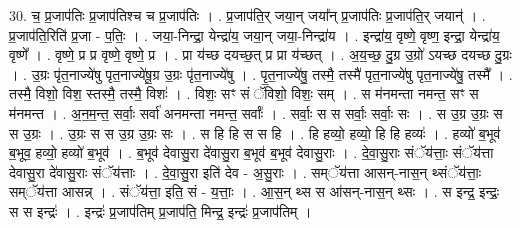 \documentclass[17pt]{extarticle}
\begin{document}
30. च॒ प्र॒जाप॑तिः प्र॒जाप॑तिश्च च प्र॒जाप॑तिः । . प्र॒जाप॑ति॒र् जया॒न् जया᳚न् प्र॒जाप॑तिः प्र॒जाप॑ति॒र् जयान्॑ । . प्र॒जाप॑ति॒रिति॑ प्र॒जा - प॒तिः॒ । . जया॒-निन्द्रा॒ येन्द्रा॑य॒ जया॒न् जया॒-निन्द्रा॑य । . इन्द्रा॑य॒ वृष्णे॒ वृष्ण॒ इन्द्रा॒ येन्द्रा॑य॒ वृष्णे᳚ । . वृष्णे॒ प्र प्र वृष्णे॒ वृष्णे॒ प्र । . प्रा य॑च्छ दयच्छ॒त् प्र प्रा य॑च्छत् । . अ॒य॒च्छ॒ दु॒ग्र उ॒ग्रो॑ ऽयच्छ दयच्छ दु॒ग्रः । . उ॒ग्रः पृ॑त॒नाज्ये॑षु पृत॒नाज्ये॑षू॒ग्र उ॒ग्रः पृ॑त॒नाज्ये॑षु । . पृ॒त॒नाज्ये॑षु॒ तस्मै॒ तस्मै॑ पृत॒नाज्ये॑षु पृत॒नाज्ये॑षु॒ तस्मै᳚ । . तस्मै॒ विशो॒ विश॒ स्तस्मै॒ तस्मै॒ विशः॑ । . विशः॒ सꣳ सं ॅविशो॒ विशः॒ सम् । . स म॑नमन्ता नमन्त॒ सꣳ स म॑नमन्त । . अ॒न॒म॒न्त॒ सर्वाः॒ सर्वा॑ अनमन्ता नमन्त॒ सर्वाः᳚ । . सर्वाः॒ स स सर्वाः॒ सर्वाः॒ सः । . स उ॒ग्र उ॒ग्रः स स उ॒ग्रः । . उ॒ग्रः स स उ॒ग्र उ॒ग्रः सः । . स हि हि स स हि । . हि हव्यो॒ हव्यो॒ हि हि हव्यः॑ । . हव्यो॑ ब॒भूव॑ ब॒भूव॒ हव्यो॒ हव्यो॑ ब॒भूव॑ । . ब॒भूव॑ देवासु॒रा दे॑वासु॒रा ब॒भूव॑ ब॒भूव॑ देवासु॒राः । . दे॒वा॒सु॒राः संॅय॑त्ताः॒ संॅय॑त्ता देवासु॒रा दे॑वासु॒राः संॅय॑त्ताः । . दे॒वा॒सु॒रा इति॑ देव - अ॒सु॒राः । . सम्ॅय॑त्ता आसन्-नास॒न् थ्संॅय॑त्ताः॒ सम्ॅय॑त्ता आसन्न् । . संॅय॑त्ता॒ इति॒ सं - य॒त्ताः॒ । . आ॒स॒न् थ्स स आ॑सन्-नास॒न् थ्सः । . स इन्द्र॒ इन्द्रः॒ स स इन्द्रः॑ । . इन्द्रः॑ प्र॒जाप॑तिम् प्र॒जाप॑ति॒ मिन्द्र॒ इन्द्रः॑ प्र॒जाप॑तिम् । \newline
\end{document}
